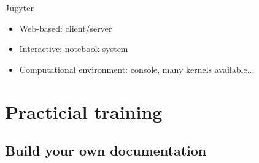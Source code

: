 \begin{frame}{Jupyter}
\begin{itemize}
\item<2-4> Web-based: client/server
\item<3-4> Interactive: notebook system
\item<4-4> Computational environment: console, many kernels available...
\end{itemize}
\end{frame}



\section{Practicial training}
\subsection{Build your own documentation}
\begin{frame}

\end{frame}
